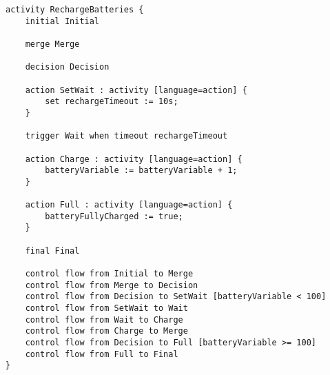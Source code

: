 \begin{lstlisting}[float,language=statechart, caption={}, label={}]
activity RechargeBatteries {
	initial Initial
	
	merge Merge
	
	decision Decision
	
	action SetWait : activity [language=action] {
		set rechargeTimeout := 10s;
	}
	
	trigger Wait when timeout rechargeTimeout
	
	action Charge : activity [language=action] {
		batteryVariable := batteryVariable + 1;
	}
	
	action Full : activity [language=action] {
		batteryFullyCharged := true;
	}
	
	final Final
	
	control flow from Initial to Merge
	control flow from Merge to Decision
	control flow from Decision to SetWait [batteryVariable < 100]
	control flow from SetWait to Wait
	control flow from Wait to Charge
	control flow from Charge to Merge
	control flow from Decision to Full [batteryVariable >= 100]
	control flow from Full to Final
}
\end{lstlisting}

